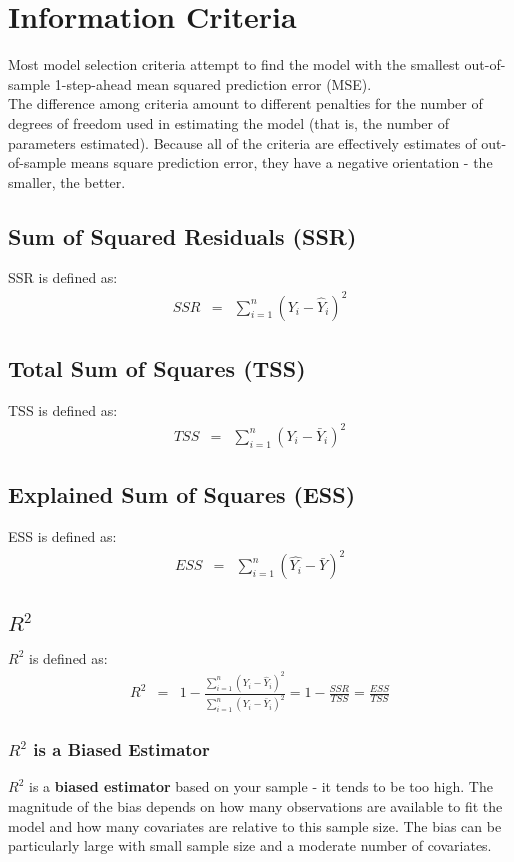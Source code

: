 \chapter{Information Criteria}
Most model selection criteria attempt to find the model with the smallest out-of-sample 1-step-ahead mean squared prediction error (MSE).\\
The difference among criteria amount to different penalties for the number of degrees of freedom used in estimating the model (that is, the number of parameters estimated). Because all of the criteria are effectively estimates of out-of-sample means square prediction error, they have a negative orientation - the smaller, the better.

\section{Sum of Squared Residuals (SSR)}
SSR is defined as:
\begin{eqnarray}
SSR &=& \sum_{i = 1}^{n}\left(Y_{i} - \hat{Y}_{i}\right)^{2}
\end{eqnarray}

\section{Total Sum of Squares (TSS)}
TSS is defined as:
\begin{eqnarray}
TSS &=& \sum_{i = 1}^{n}\left(Y_{i} - \bar{Y}_{i}\right)^{2}
\end{eqnarray}

\section{Explained Sum of Squares (ESS)}
ESS is defined as:
\begin{eqnarray}
ESS &=& \sum_{i = 1}^{n}\left(\hat{Y_{i}} - \bar{Y}\right)^{2}
\end{eqnarray}

\section{\texorpdfstring{$R^{2}$}{R2}}
$R^{2}$ is defined as:
\begin{eqnarray}
R^{2} &=& 1 - \frac{\sum_{i = 1}^{n}\left(Y_{i} - \hat{Y}_{i}\right)^{2}}{\sum_{i = 1}^{n}\left(Y_{i} - \bar{Y}_{i}\right)^{2}} = 1 - \frac{SSR}{TSS} = \frac{ESS}{TSS}
\end{eqnarray}

\subsection{\texorpdfstring{$R^{2}$}{R2} is a Biased Estimator}
$R^{2}$ is a \textbf{\color{blue}biased estimator} based on your sample -  it tends to be too high. The magnitude of the bias depends on how many observations are available to fit the model and how many covariates are relative to this sample size. The bias can be particularly large with small sample size and a moderate number of covariates.

